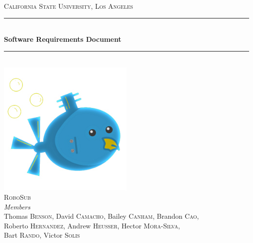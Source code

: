 \documentclass[11pt]{article}
\begin{document}
\begin{titlepage} 

	\newcommand{\HRule}{\rule{\linewidth}{0.5mm}} 
	\center %

	\textsc{\LARGE California State University, Los Angeles}\\[1.5cm] 

	\HRule\\[0.4cm]
    {\huge\bfseries Software Requirements Document}\\[0.4cm] 
	\HRule\\[1.5cm]

	\vfill\vfill
	\includegraphics[width=0.5\textwidth]{../robosub_logo.png}\\[1cm] 

	\textsc{\Large RoboSub}\\[0.5cm] 

	{\large\textit{Members}}\\
	Thomas \textsc{Benson},
	David \textsc{Camacho},
	Bailey \textsc{Canham},
	Brandon \textsc{Cao},\\
	Roberto \textsc{Hernandez},
	Andrew \textsc{Heusser},
    Hector \textsc{Mora-Silva},\\
	Bart \textsc{Rando},
	Victor \textsc{Solis}


\end{titlepage}
\end{document}
